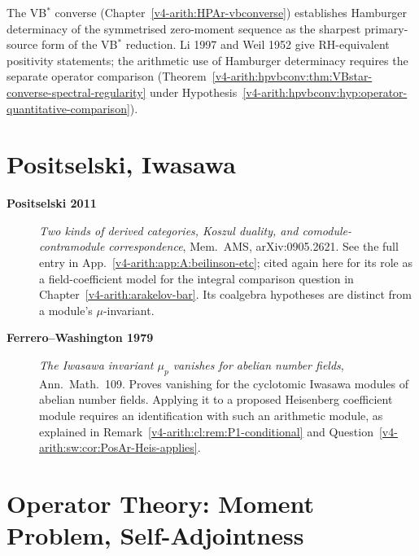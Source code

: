 The VB\(^{*}\) converse
(Chapter~\ref{v4-arith:HPAr-vbconverse}) establishes Hamburger
determinacy of the symmetrised zero-moment sequence as the
sharpest primary-source form of the VB\(^{*}\) reduction. Li 1997
and Weil 1952 give RH-equivalent positivity statements; the arithmetic use of Hamburger
determinacy requires the separate operator comparison
(Theorem~\ref{v4-arith:hpvbconv:thm:VBstar-converse-spectral-regularity} under Hypothesis~\ref{v4-arith:hpvbconv:hyp:operator-quantitative-comparison}).

\section{Positselski, Iwasawa}
\label{v4-arith:app:A:positselski-iwasawa}

\begin{description}
\item[\textbf{Positselski 2011}] \emph{Two kinds of derived categories,
Koszul duality, and comodule-contramodule correspondence},
Mem.~AMS, arXiv:0905.2621. See the full entry in
App.~\ref{v4-arith:app:A:beilinson-etc}; cited again here for its
role as a field-coefficient model for the integral comparison
question in Chapter~\ref{v4-arith:arakelov-bar}.
Its coalgebra hypotheses are distinct from a module's
\(\mu\)-invariant.
\item[\textbf{Ferrero--Washington 1979}] \emph{The Iwasawa invariant
\(\mu_{p}\) vanishes for abelian number fields}, Ann.~Math.~109.
Proves vanishing for the cyclotomic Iwasawa modules of abelian
number fields. Applying it to a proposed Heisenberg coefficient
module requires an identification with such an arithmetic module,
as explained in Remark~\ref{v4-arith:cl:rem:P1-conditional} and
Question~\ref{v4-arith:sw:cor:PosAr-Heis-applies}.
\end{description}

\section{Operator Theory: Moment Problem, Self-Adjointness}
\label{v4-arith:app:A:operator-theory}

